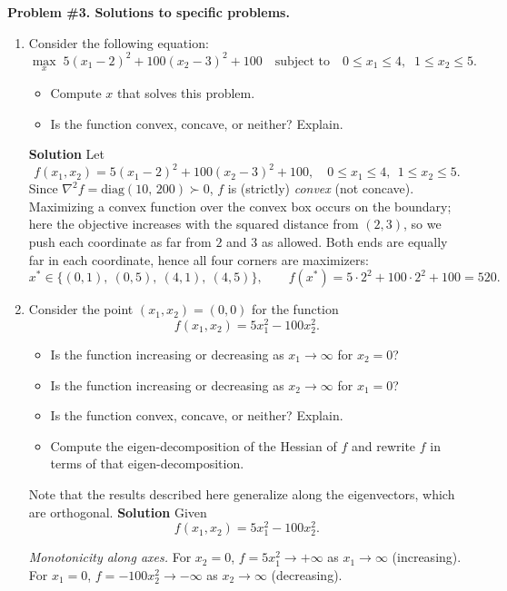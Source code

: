 \documentclass[11pt]{article}
\begin{document}
	\newpage
	\textbf{Problem \#3. Solutions to specific problems.}
	
	\begin{enumerate}[label=3(\alph*)]
		
		\item Consider the following equation:
		\[
		\max_{x}\; 5 (x_1 - 2)^2 + 100 (x_2 - 3)^2 + 100
		\quad \text{subject to}\quad
		0 \le x_1 \le 4,\;\; 1 \le x_2 \le 5.
		\]
		\begin{itemize}
			\item Compute $x$ that solves this problem.
			\item Is the function convex, concave, or neither? Explain.
		\end{itemize}
		\textbf{Solution}
		Let 
		\[
		f(x_1,x_2)=5(x_1-2)^2+100(x_2-3)^2+100,\quad
		0\le x_1\le 4,\ \ 1\le x_2\le 5.
		\]
		Since $\nabla^2 f=\mathrm{diag}(10,\,200)\succ0$, $f$ is (strictly) \emph{convex} (not concave). 
		Maximizing a convex function over the convex box occurs on the boundary; here the objective increases with the squared distance from $(2,3)$, so we push each coordinate as far from $2$ and $3$ as allowed. Both ends are equally far in each coordinate, hence all four corners are maximizers:
		\[
		x^*\in\{(0,1),\ (0,5),\ (4,1),\ (4,5)\},
		\qquad
		f(x^*)=5\cdot 2^2+100\cdot 2^2+100=520.
		\]

		\item Consider the point $(x_1, x_2) = (0,0)$ for the function
		\[
		f(x_1,x_2) = 5 x_1^{2} - 100 x_2^{2}.
		\]
		\begin{itemize}
			\item Is the function increasing or decreasing as $x_1 \to \infty$ for $x_2 = 0$?
			\item Is the function increasing or decreasing as $x_2 \to \infty$ for $x_1 = 0$?
			\item Is the function convex, concave, or neither? Explain.
			\item Compute the eigen-decomposition of the Hessian of $f$ and rewrite $f$ in terms of that eigen-decomposition.
		\end{itemize}
		\noindent
		Note that the results described here generalize along the eigenvectors, which are orthogonal.
		\textbf{Solution}
		Given
		\[
		f(x_1,x_2)=5x_1^2-100x_2^2.
		\]
		
		\emph{Monotonicity along axes.}
		For $x_2=0$, $f=5x_1^2 \to +\infty$ as $x_1\to\infty$ (increasing).
		For $x_1=0$, $f=-100x_2^2 \to -\infty$ as $x_2\to\infty$ (decreasing).
		

\end{enumerate}
\end{document}
